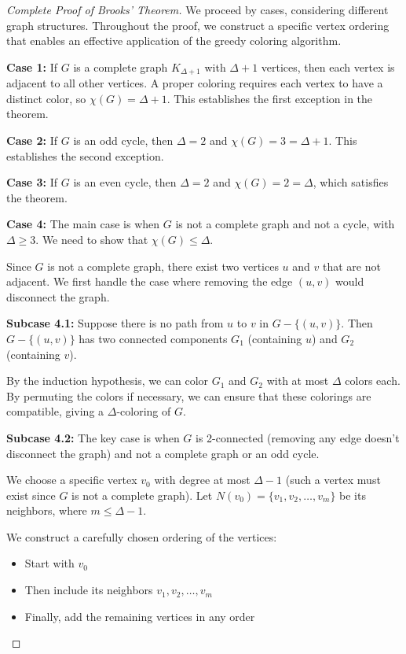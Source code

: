 \documentclass{article}
\theoremstyle{definition}
\begin{document}
\begin{proof}[Complete Proof of Brooks' Theorem]
We proceed by cases, considering different graph structures. Throughout the proof, we construct a specific vertex ordering that enables an effective application of the greedy coloring algorithm.

\textbf{Case 1:} If $G$ is a complete graph $K_{\Delta+1}$ with $\Delta+1$ vertices, then each vertex is adjacent to all other vertices. A proper coloring requires each vertex to have a distinct color, so $\chi(G) = \Delta+1$. This establishes the first exception in the theorem.

\textbf{Case 2:} If $G$ is an odd cycle, then $\Delta = 2$ and $\chi(G) = 3 = \Delta+1$. This establishes the second exception.

\textbf{Case 3:} If $G$ is an even cycle, then $\Delta = 2$ and $\chi(G) = 2 = \Delta$, which satisfies the theorem.

\textbf{Case 4:} The main case is when $G$ is not a complete graph and not a cycle, with $\Delta \geq 3$. We need to show that $\chi(G) \leq \Delta$.

Since $G$ is not a complete graph, there exist two vertices $u$ and $v$ that are not adjacent. We first handle the case where removing the edge $(u,v)$ would disconnect the graph.

\textbf{Subcase 4.1:} Suppose there is no path from $u$ to $v$ in $G - \{(u,v)\}$. Then $G - \{(u,v)\}$ has two connected components $G_1$ (containing $u$) and $G_2$ (containing $v$).

By the induction hypothesis, we can color $G_1$ and $G_2$ with at most $\Delta$ colors each. By permuting the colors if necessary, we can ensure that these colorings are compatible, giving a $\Delta$-coloring of $G$.

\textbf{Subcase 4.2:} The key case is when $G$ is 2-connected (removing any edge doesn't disconnect the graph) and not a complete graph or an odd cycle.

We choose a specific vertex $v_0$ with degree at most $\Delta-1$ (such a vertex must exist since $G$ is not a complete graph). Let $N(v_0) = \{v_1, v_2, \ldots, v_m\}$ be its neighbors, where $m \leq \Delta-1$.

We construct a carefully chosen ordering of the vertices:
\begin{itemize}
    \item Start with $v_0$
    \item Then include its neighbors $v_1, v_2, \ldots, v_m$
    \item Finally, add the remaining vertices in any order
\end{itemize}


\end{proof}
\end{document}

